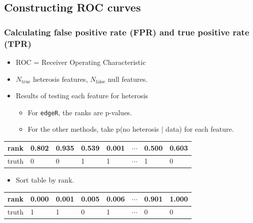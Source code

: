 \documentclass[handout]{beamer}
\numberwithin{equation}{section}
\begin{document}
\subsection{Constructing ROC curves}

\begin{frame}
\frametitle{Calculating false positive rate (FPR) and true positive rate (TPR)}

\begin{itemize}
\item ROC = Receiver Operating Characteristic
\item $N_{\text{true}}$ heterosis features, $N_{\text{false}}$ null features.
\pause \item Results of testing each feature for heterosis
\begin{itemize}
\item For {\tt edgeR}, the ranks are p-values.
\item For the other methods, take p(no heterosis $|$ data) for each feature.
\end{itemize}


\end{itemize}

\begin{tabular}{l|l|l|l|l|l|l|l}
rank & 0.802 & 0.935 & 0.539 & 0.001 & $\cdots$ & 0.500 &  0.603  \\ \hline
truth &  0 & 0 & 1 & 1 & $\cdots$ & 1 & 0 
\end{tabular}

\begin{itemize}

\pause \item Sort table by rank.
\end{itemize}

\begin{tabular}{l|l|l|l|l|l|l|l}
rank & 0.000 & 0.001 & 0.005 & 0.006 & $\cdots$ & 0.901 & 1.000  \\ \hline
truth &  1 & 1 & 0 & 1 & $\cdots$ & 0 & 0
\end{tabular}
\end{frame}
\end{document}
